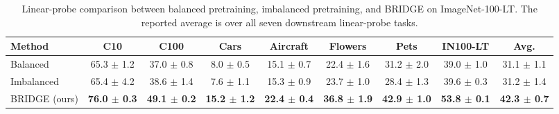 \begin{table}[t]
\centering
\tiny
\setlength{\tabcolsep}{3.0pt}
\caption{Linear-probe comparison between balanced pretraining, imbalanced pretraining, and BRIDGE on ImageNet-100-LT. The reported average is over all seven downstream linear-probe tasks.}
\label{tab:main_baselines_linear}
\begin{adjustbox}{max width=\textwidth}
\begin{tabular}{l c c c c c c c c}
\toprule
Method & C10 & C100 & Cars & Aircraft & Flowers & Pets & IN100-LT & Avg. \\
\midrule
Balanced & 65.3 {\scriptsize$\pm$ 1.2} & 37.0 {\scriptsize$\pm$ 0.8} & 8.0 {\scriptsize$\pm$ 0.5} & 15.1 {\scriptsize$\pm$ 0.7} & 22.4 {\scriptsize$\pm$ 1.6} & 31.2 {\scriptsize$\pm$ 2.0} & 39.0 {\scriptsize$\pm$ 1.0} & 31.1 {\scriptsize$\pm$ 1.1} \\
Imbalanced & 65.4 {\scriptsize$\pm$ 4.2} & 38.6 {\scriptsize$\pm$ 1.4} & 7.6 {\scriptsize$\pm$ 1.1} & 15.3 {\scriptsize$\pm$ 0.9} & 23.7 {\scriptsize$\pm$ 1.0} & 28.4 {\scriptsize$\pm$ 1.3} & 39.6 {\scriptsize$\pm$ 0.3} & 31.2 {\scriptsize$\pm$ 1.4} \\
\rowcolor{blue!10} BRIDGE (ours) & \textbf{76.0 {\scriptsize$\pm$ 0.3}} & \textbf{49.1 {\scriptsize$\pm$ 0.2}} & \textbf{15.2 {\scriptsize$\pm$ 1.2}} & \textbf{22.4 {\scriptsize$\pm$ 0.4}} & \textbf{36.8 {\scriptsize$\pm$ 1.9}} & \textbf{42.9 {\scriptsize$\pm$ 1.0}} & \textbf{53.8 {\scriptsize$\pm$ 0.1}} & \textbf{42.3 {\scriptsize$\pm$ 0.7}} \\
\bottomrule
\end{tabular}
\end{adjustbox}
\end{table}
